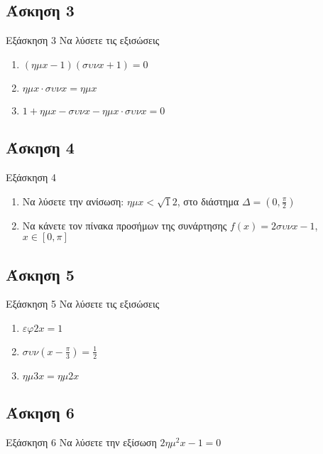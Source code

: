 \documentclass[greek]{beamer}
\begin{document}
\subsection{Άσκηση 3}
\begin{frame}[label=Άσκηση3]{Εξάσκηση 3}
 Να λύσετε τις εξισώσεις
 \begin{enumerate}
  \item<1-> $(ημx-1)(συνx+1)=0$
  \item<2-> $ημx\cdot συνx=ημx$
  \item<3-> $1+ημx-συνx-ημx\cdot συνx=0$
 \end{enumerate}

\end{frame}

\subsection{Άσκηση 4}
\begin{frame}[label=Άσκηση4]{Εξάσκηση 4}
 \begin{enumerate}
  \item<1-> Να λύσετε την ανίσωση: $ημx<\sqrt{1}{2}$, στο διάστημα $Δ=(0,\frac{π}{2})$
  \item<2-> Να κάνετε τον πίνακα προσήμων της συνάρτησης $f(x)=2συνx-1$, $x\in [0,π]$
 \end{enumerate}

\end{frame}

\subsection{Άσκηση 5}
\begin{frame}[label=Άσκηση5]{Εξάσκηση 5}
 Να λύσετε τις εξισώσεις
 \begin{enumerate}
  \item<1-> $εφ2x=1$
  \item<2-> $συν(x-\frac{π}{3})=\frac{1}{2}$
  \item<3-> $ημ3x=ημ2x$
 \end{enumerate}

\end{frame}

\subsection{Άσκηση 6}
\begin{frame}[label=Άσκηση6]{Εξάσκηση 6}
 Να λύσετε την εξίσωση $2ημ^2x-1=0$

\end{frame}
\end{document}
